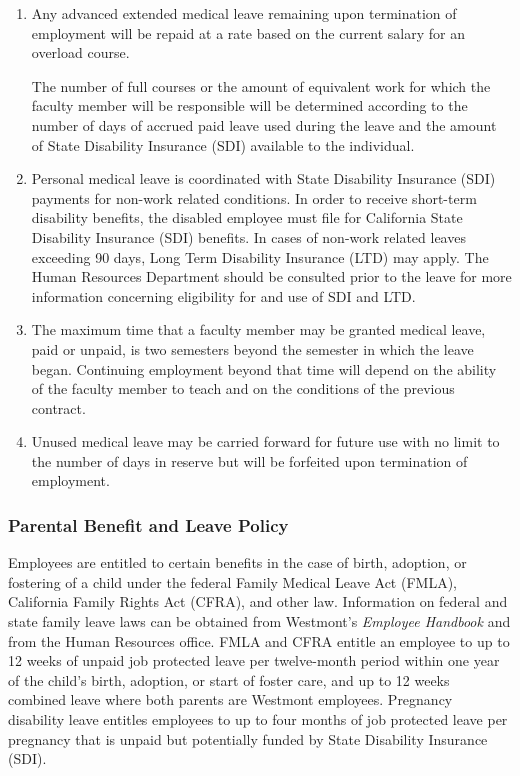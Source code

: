 \begin{enumerate}[label=\alph*)]
{				}

				\item{ Any advanced extended medical leave remaining upon
					termination of employment will be repaid at a rate based on the
					current salary for an overload course. }

				The number of full courses or the amount of equivalent work for which the faculty member will be responsible will be determined according to the number of days of accrued paid leave used during the leave and the amount of State Disability Insurance (SDI) available to the individual.

				\item{ Personal medical leave is coordinated with State Disability
					Insurance (SDI) payments for non-work related conditions. In order
					to receive short-term disability benefits, the disabled employee
					must file for California State Disability Insurance (SDI) benefits.
					In cases of non-work related leaves exceeding 90 days, Long Term
					Disability Insurance (LTD) may apply.  The Human Resources
					Department should be consulted prior to the leave for more
					information concerning eligibility for and use of SDI and LTD. }

				\item{ The maximum time that a faculty member may be granted medical
					leave, paid or unpaid, is two semesters beyond the semester in which
					the leave began.  Continuing employment beyond that time will depend
					on the ability of the faculty member to teach and on the conditions
					of the previous contract. }

				\item{ Unused medical leave may be carried forward for future use
					with no limit to the number of days in reserve but will be forfeited
					upon termination of employment. }

			\end{enumerate}
		\subsubsection{Parental Benefit and Leave Policy}

			Employees are entitled to certain benefits in the case of birth, adoption, or fostering of a child under the federal Family Medical Leave Act (FMLA), California Family Rights Act (CFRA), and other law. Information on federal and state family leave laws can be obtained from Westmont's \emph{Employee Handbook} and from the Human Resources office. FMLA and CFRA entitle an employee to up to 12 weeks of unpaid job protected leave per twelve-month period within one year of the child's birth, adoption, or start of foster care, and up to 12 weeks combined leave where both parents are Westmont employees. Pregnancy disability leave entitles employees to up to four months of job protected leave per pregnancy that is unpaid but potentially funded by State Disability Insurance (SDI).

